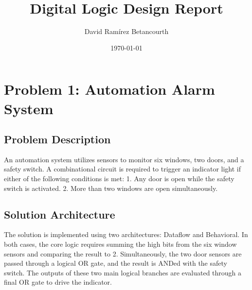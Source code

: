 \documentclass{article}
\title{Digital Logic Design Report}
\author{David Ramírez Betancourth}
\date{\today}
\begin{document}
\maketitle

\section{Problem 1: Automation Alarm System}

\subsection{Problem Description}
An automation system utilizes sensors to monitor six windows, two doors, and a safety switch. A combinational circuit is required to trigger an indicator light if either of the following conditions is met:
1. Any door is open while the safety switch is activated.
2. More than two windows are open simultaneously.

\subsection{Solution Architecture}
The solution is implemented using two architectures: Dataflow and Behavioral. In both cases, the core logic requires summing the high bits from the six window sensors and comparing the result to 2. Simultaneously, the two door sensors are passed through a logical OR gate, and the result is ANDed with the safety switch. The outputs of these two main logical branches are evaluated through a final OR gate to drive the indicator.
\end{document}
